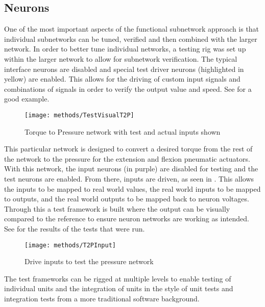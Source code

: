 \subsection{Neurons}

One of the most important aspects of the functional subnetwork approach is that
individual subnetworks can be tuned, verified and then combined with the larger
network. In order to better tune individual networks, a testing rig was set up
within the larger network to allow for subnetwork verification. The typical
interface neurons are disabled and special test driver neurons (highlighted in
yellow) are enabled. This allows for the driving of custom input signals and
combinations of signals in order to verify the output value and speed. 
See  for a good example.

\begin{figure}
\centering
\texttt{[image: methods/TestVisualT2P]}
\caption{Torque to Pressure network with test and actual inputs shown}
\label{fig:TestNetworkT2P}
\end{figure}

This particular network is designed to convert a desired torque from the rest
of the network to the pressure for the extension and flexion pneumatic actuators.
With this network, the input neurons (in purple)
are disabled for testing and the test neurons are enabled. From there, inputs
are driven, as seen in . This allows the inputs to 
be mapped to real world values, the real world inputs to be mapped to outputs, 
and the real world outputs to be mapped back to neuron voltages. Through this
a test framework is built where the output can be visually compared to the 
reference to ensure neuron networks are working as intended. See 
 for the results of the tests that were run.

\begin{figure}
\centering
\texttt{[image: methods/T2PInput]}
\caption{Drive inputs to test the pressure network}
\label{fig:TestNetworkInputs}
\end{figure}

The test frameworks can be rigged at multiple levels to enable testing of
individual units and the integration of units in the style of unit tests and
integration tests from a more traditional software background.
